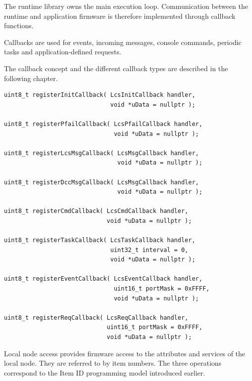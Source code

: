 
The runtime library owns the main execution loop. Communication between the 
runtime and application firmware is therefore implemented through callback functions.

Callbacks are used for events, incoming messages, console commands, periodic 
tasks and application-defined requests.

The callback concept and the different callback types are described in the 
following chapter.

\begin{lstlisting}[style=api-interface]
uint8_t registerInitCallback( LcsInitCallback handler,
                              void *uData = nullptr );

uint8_t registerPfailCallback( LcsPfailCallback handler,
                               void *uData = nullptr );

uint8_t registerLcsMsgCallback( LcsMsgCallback handler,
                                void *uData = nullptr );

uint8_t registerDccMsgCallback( LcsMsgCallback handler,
                                void *uData = nullptr );

uint8_t registerCmdCallback( LcsCmdCallback handler,
                             void *uData = nullptr );

uint8_t registerTaskCallback( LcsTaskCallback handler,
                              uint32_t interval = 0,
                              void *uData = nullptr );

uint8_t registerEventCallback( LcsEventCallback handler,
                               uint16_t portMask = 0xFFFF,
                               void *uData = nullptr );

uint8_t registerReqCallback( LcsReqCallback handler,
                             uint16_t portMask = 0xFFFF,
                             void *uData = nullptr );
\end{lstlisting}


Local node access provides firmware access to the attributes and services of  
the local node. They are referred to by item numbers. The three operations 
correspond to the Item ID programming model introduced earlier.

